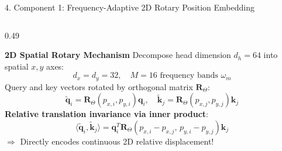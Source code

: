 \documentclass[aspectratio=169,10pt]{beamer}
\begin{document}
\begin{frame}{4. Component 1: Frequency-Adaptive 2D Rotary Position Embedding}
\vspace{-0.3em}
\begin{columns}[t]
    \begin{column}{0.49\textwidth}
        \begin{block}{\textbf{2D Spatial Rotary Mechanism}}
            \small
            Decompose head dimension $d_h = 64$ into spatial $x, y$ axes:
            \vspace{-0.3em}
            \[ d_x = d_y = 32, \quad M = 16 \text{ frequency bands } \omega_m \]
            \vspace{-0.3em}
            Query and key vectors rotated by orthogonal matrix $\mathbf{R}_{\Theta}$:
            \vspace{-0.3em}
            \[ \tilde{\mathbf{q}}_i = \mathbf{R}_{\Theta}(p_{x,i}, p_{y,i}) \mathbf{q}_i, \quad \tilde{\mathbf{k}}_j = \mathbf{R}_{\Theta}(p_{x,j}, p_{y,j}) \mathbf{k}_j \]
            \vspace{-0.3em}
            \textbf{Relative translation invariance via inner product}:
            \vspace{-0.3em}
            \[ \langle \tilde{\mathbf{q}}_i, \tilde{\mathbf{k}}_j \rangle = \mathbf{q}_i^T \mathbf{R}_{\Theta}(p_{x,i}-p_{x,j}, \, p_{y,i}-p_{y,j}) \mathbf{k}_j \]
            \vspace{-0.3em}
            $\Rightarrow$ Directly encodes continuous 2D relative displacement!
        \end{block}
    \end{column}


\end{columns}
\end{frame}
\end{document}
